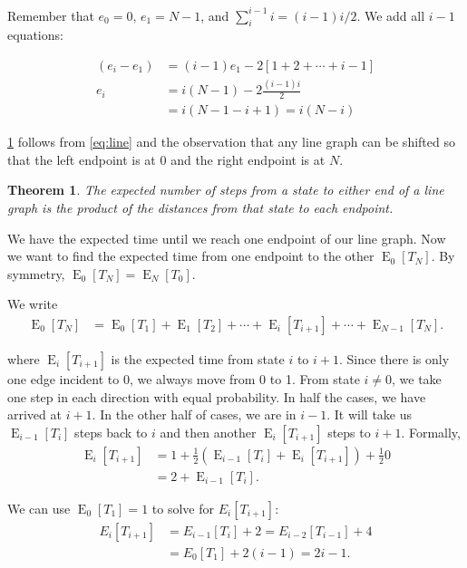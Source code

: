 \documentclass[12pt]{article}
\newtheorem{theorem}{Theorem}
\theoremstyle{definition}
\DeclareMathOperator{\E}{\mathrm{E}}		     %
\begin{document}
Remember that $e_0=0$, $e_1=N-1$, and 
$\sum_{i}^{i-1} i = (i-1)i/2$.
We add all $i-1$ equations:

\begin{align}
(e_i - e_1) &= (i-1) e_1 - 2[1+2+\cdots+i-1] \nonumber \\
e_i &= i(N-1) - 2 \frac{(i-1)i}{2} \nonumber\\
&= i(N-1 - i + 1) = i(N-i)
\label{eq:line}
\end{align}



\cref{thm:line} follows from \cref{eq:line} and the observation that any
line graph can be shifted so that the left endpoint
is at $0$ and the right endpoint is at $N$.

\begin{theorem}
The expected number of steps from a state to either end of a line graph
is the product of the distances from that state to each endpoint.
\label{thm:line}
\end{theorem}

We have the expected time until we reach one endpoint of our line graph.
Now we want to find the expected time from one endpoint to the other $\E_0[T_N]$.
By symmetry, $\E_0[T_N] = \E_N[T_0]$.

We write
\begin{align}
\E_0[T_N] &= \E_0[T_1] + \E_1[T_2] + \cdots + \E_{i}[T_{i+1}] + \cdots + \E_{N-1}[T_N]. \nonumber
\end{align}

where $\E_{i}[T_{i+1}]$ is the expected time from state $i$ to $i+1$.
Since there is only one edge incident to 0, we always move from 0 to 1.
From state $i\neq0$, we take one step in each direction with equal probability.
In half the cases, we have arrived at $i+1$.
In the other half of cases, we are in $i-1$.
It will take us $\E_{i-1}[T_i]$ steps back to $i$ and then another
$\E_i[T_{i+1}]$ steps to $i+1$.
Formally,
\begin{align}
\E_{i}[T_{i+1}] &= 1 + \frac{1}{2}(\E_{i-1}[T_i]+\E_i[T_{i+1}]) +\frac{1}{2}0 \nonumber \\
 &= 2 + \E_{i-1}[T_{i}]. \nonumber
\end{align}

We can use $\E_0[T_1] = 1$ to solve for $E_i[T_{i+1}]$:
\begin{align}
E_i[T_{i+1}] &= E_{i-1}[T_{i}] + 2 = E_{i-2}[T_{i-1}] + 4 \nonumber\\
 &= E_0[T_1] + 2(i-1) = 2i - 1. \nonumber
\end{align}
\end{document}
